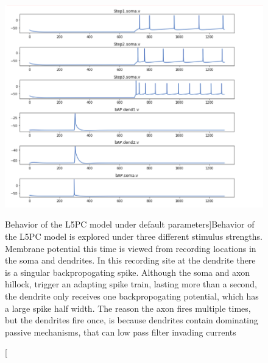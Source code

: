 \begin{figure}
    \centering
    \includegraphics{figures/l5pc_before_opt}
    \caption[L5PC before optimization][Behavior of the L5PC model under default parameters]{Behavior of the L5PC model is explored under three different stimulus strengths. Membrane potential this time is viewed from recording locations in the soma and dendrites. In this recording site at the dendrite there is a singular backpropogating spike. Although the soma and axon hillock, trigger an adapting spike train, lasting more than a second, the dendrite only receives one backpropogating potential, which has a large spike half width. The reason the axon fires multiple times, but the dendrites fire once, is because  dendrites contain dominating passive mechanisms, that can low pass filter invading currents}
    \label{fig:my_label}
\end{figure}

